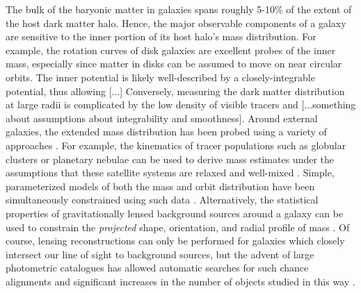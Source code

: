 \documentclass[letterpaper,12pt,preprint]{aastex}
\begin{document}
The bulk of the baryonic matter in galaxies spans roughly 5-10\% of the extent of the host dark matter halo. Hence, the major observable components of a galaxy are sensitive to the inner portion of its host halo's mass distribution. For example, the rotation curves of disk galaxies are excellent probes of the inner mass, especially since matter in disks can be assumed to move on near circular orbits. The inner potential is likely well-described by a closely-integrable potential, thus allowing [...] Conversely, measuring the dark matter distribution at large radii is complicated by the low density of visible tracers and [...something about assumptions about integrability and smoothness]. Around external galaxies, the extended mass distribution has been probed using a variety of approaches \citep[see][for a a complete and detailed review]{courteau13}. For example, the kinematics of tracer populations such as globular clusters or planetary nebulae can be used to derive mass estimates under the assumptions that these satellite systems are relaxed and well-mixed \citep[early investigations include][]{mendez01,cote03}. Simple, parameterized models of both the mass and orbit distribution have been simultaneously constrained using such data \citep[e.g.][]{napolitano11,deason12c}. 
Alternatively, the statistical properties of gravitationally lensed background sources around a galaxy can be used to constrain the \emph{projected} shape, orientation, and radial profile of mass \citep[as done by the Lens Structure and Dynamics Survey described in][]{koopmans02}. Of course, lensing reconstructions can only be performed for galaxies which closely intersect our line of sight to background sources, but the advent of large photometric catalogues has allowed automatic searches for such chance alignments and significant increases in the number of objects studied in this way \citep[e.g. the Sloan Lens ACS Survey, see][]{bolton06}.
\end{document}
